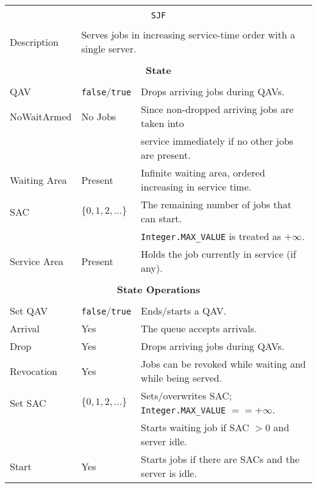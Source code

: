 \documentclass[12pt]{book}
\begin{document}
\begin{tabular}{|l|l|l|}
\hline
\multicolumn{3}{|c|}{} \\
\multicolumn{3}{|c|}{\lstinline[basicstyle=\large]{SJF}} \\
\multicolumn{3}{|c|}{} \\
\hline
Description & \multicolumn{2}{|l|}{Serves jobs in increasing service-time order with a single server.} \\
\hline
\multicolumn{3}{|c|}{} \\
\multicolumn{3}{|c|}{\bf State} \\
\multicolumn{3}{|c|}{} \\
\hline
QAV & \lstinline|false|/\lstinline|true| & Drops arriving jobs during QAVs. \\
\hline
NoWaitArmed & No Jobs & Since non-dropped arriving jobs are taken into \\
            &         & service immediately if no other jobs are present. \\
\hline
Waiting Area & Present & Infinite waiting area, ordered increasing in service time. \\
\hline
SAC & $\{0, 1, 2, \ldots\}$ & The remaining number of jobs that can start. \\
    &                       & \lstinline|Integer.MAX_VALUE| is treated as $+\infty$. \\
\hline
Service Area & Present & Holds the job currently in service (if any). \\
\hline
\multicolumn{3}{|c|}{} \\
\multicolumn{3}{|c|}{\bf State Operations} \\
\multicolumn{3}{|c|}{} \\
\hline
Set QAV & \lstinline|false|/\lstinline|true| & Ends/starts a QAV. \\
\hline
Arrival & Yes & The queue accepts arrivals. \\
\hline
Drop & Yes & Drops arriving jobs during QAVs. \\
\hline
Revocation & Yes & Jobs can be revoked while waiting and while being served. \\
\hline
Set SAC & $\{0, 1, 2, \ldots\}$ & Sets/overwrites SAC; \lstinline|Integer.MAX_VALUE| $== +\infty$. \\
        &                       & Starts waiting job if SAC $> 0$ and server idle. \\
\hline
Start & Yes & Starts jobs if there are SACs and the server is idle. \\
\hline

\end{tabular}
\end{document}
